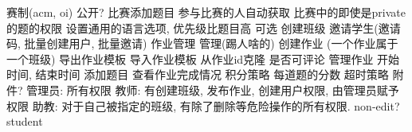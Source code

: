 \markdownRendererUlItem 赛制(acm, oi)\markdownRendererUlItemEnd 
\markdownRendererUlItem {}\markdownRendererUlItemEnd 
\markdownRendererUlItem 公开?\markdownRendererUlItemEnd 
\markdownRendererUlItem 比赛添加题目\markdownRendererUlItemEnd 
\markdownRendererUlItem 参与比赛的人自动获取 比赛中的即使是private的题的权限\markdownRendererUlItemEnd 
\markdownRendererUlItem 设置通用的语言选项, 优先级比题目高  可选\markdownRendererUlItemEnd 
\markdownRendererUlEndTight \markdownRendererInterblockSeparator
{}\markdownRendererInterblockSeparator
{}\markdownRendererUlBeginTight
\markdownRendererUlItem 创建班级\markdownRendererUlItemEnd 
\markdownRendererUlItem 邀请学生(邀请码, 批量创建用户, 批量邀请)\markdownRendererUlItemEnd 
\markdownRendererUlItem 作业管理\markdownRendererUlItemEnd 
\markdownRendererUlItem 管理(踢人啥的)\markdownRendererUlItemEnd 
\markdownRendererUlEndTight \markdownRendererInterblockSeparator
{}\markdownRendererInterblockSeparator
{}\markdownRendererUlBeginTight
\markdownRendererUlItem 创建作业 (一个作业属于一个班级)\markdownRendererUlItemEnd 
\markdownRendererUlItem 导出作业模板\markdownRendererUlItemEnd 
\markdownRendererUlItem 导入作业模板\markdownRendererUlItemEnd 
\markdownRendererUlItem 从作业id克隆\markdownRendererUlItemEnd 
\markdownRendererUlItem 是否可评论\markdownRendererUlItemEnd 
\markdownRendererUlItem 管理作业\markdownRendererUlItemEnd 
\markdownRendererUlItem 开始时间, 结束时间\markdownRendererUlItemEnd 
\markdownRendererUlItem 添加题目\markdownRendererUlItemEnd 
\markdownRendererUlItem 查看作业完成情况\markdownRendererUlItemEnd 
\markdownRendererUlItem 积分策略\markdownRendererUlItemEnd 
\markdownRendererUlItem 每道题的分数\markdownRendererUlItemEnd 
\markdownRendererUlItem 超时策略\markdownRendererUlItemEnd 
\markdownRendererUlItem 附件?\markdownRendererUlItemEnd 
\markdownRendererUlEndTight \markdownRendererInterblockSeparator
{}\markdownRendererInterblockSeparator
{}\markdownRendererUlBeginTight
\markdownRendererUlItem 管理员: 所有权限\markdownRendererUlItemEnd 
\markdownRendererUlItem 教师: 有创建班级, 发布作业, 创建用户权限, 由管理员赋予权限\markdownRendererUlItemEnd 
\markdownRendererUlItem 助教: 对于自己被指定的班级, 有除了删除等危险操作的所有权限.\markdownRendererUlItemEnd 
\markdownRendererUlItem non-edit?\markdownRendererUlItemEnd 
\markdownRendererUlItem student\markdownRendererUlItemEnd 
\markdownRendererUlEndTight \markdownRendererInterblockSeparator
